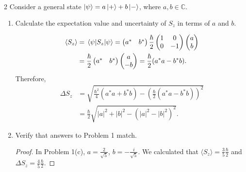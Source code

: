 \documentclass[11pt]{article}
\begin{document}
\begin{problem}{2}
  Consider a general state \( \ket{\psi} = a \ket{+} + b \ket{-} \), where \( a, b \in \mathbb{C} \).
  \begin{enumerate}[label=(\alph*)]
    \item Calculate the expectation value and uncertainty of \( S_z \) in terms of \( a \) and \( b \).
          \begin{answer}
            \begin{equation}
            \label{eq:9}
            \begin{aligned}
            \langle S_z \rangle &= \ev{S_z}{\psi} = \begin{pmatrix}
a^{*}  & b^{*}
 \end{pmatrix} \frac{\hbar}{2} \begin{pmatrix}
1  & 0 \\
0  & -1
 \end{pmatrix} \begin{pmatrix}
a \\
b
 \end{pmatrix} \\
              &= \frac{\hbar}{2} \begin{pmatrix}
a^{*}  & b^{*}
 \end{pmatrix} \begin{pmatrix}
a \\
-b
 \end{pmatrix} = \frac{\hbar}{2}(a ^{*} a - b^{*} b).
            \end{aligned}
          \end{equation}
          Therefore,
          \begin{equation}
          \label{eq:10}
          \begin{aligned}
            \Delta S_z &= \sqrt{\frac{\hbar^2}{4} \left( a^{*}a + b^{*}b \right) - \left( \frac{\hbar}{2}(a ^{*} a - b ^{*} b) \right)^2} \\
            &= \frac{\hbar}{2} \sqrt{|a|^2 + |b|^2 - (|a|^2 - |b|^2)^2}.
          \end{aligned}
          \end{equation}
          \end{answer}
    \item Verify that answers to Problem 1 match.
          \begin{proof}
            In Problem 1(c), \( a = \frac{2}{\sqrt{5}} \), \( b = - \frac{i}{\sqrt{5}} \).
            We calculated that \(\langle S_z \rangle = \frac{3}{5} \frac{\hbar}{2}\) and \(\Delta S_z = \frac{4}{5} \frac{\hbar}{2}\).

\end{proof}
\end{enumerate}
\end{problem}
\end{document}
